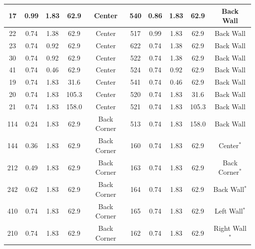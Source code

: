 \begin{table}
\begin{center}
\begin{tabular}{|c|c|c|c|c||c|c|c|c|c|}
17      & 0.99      & 1.83          &  62.9      & Center       & 540   & 0.86      & 1.83        &  62.9         & Back Wall           \\ \hline
22      & 0.74      & 1.38          &  62.9      & Center       & 517   & 0.99      & 1.83        &  62.9         & Back Wall           \\ \hline
23      & 0.74      & 0.92          &  62.9      & Center       & 622   & 0.74      & 1.38        &  62.9         & Back Wall           \\ \hline
30      & 0.74      & 0.92          &  62.9      & Center       & 522   & 0.74      & 1.38        &  62.9         & Back Wall           \\ \hline
41      & 0.74      & 0.46          &  62.9      & Center       & 524   & 0.74      & 0.92        &  62.9         & Back Wall           \\ \hline
19      & 0.74      & 1.83          &  31.6      & Center       & 541   & 0.74      & 0.46        &  62.9         & Back Wall           \\ \hline
20      & 0.74      & 1.83          &  105.3     & Center       & 520   & 0.74      & 1.83        &  31.6         & Back Wall           \\ \hline
21      & 0.74      & 1.83          &  158.0     & Center       & 521   & 0.74      & 1.83        &  105.3        & Back Wall           \\ \hline
114     & 0.24      & 1.83          &  62.9      & Back Corner  & 513   & 0.74      & 1.83        &  158.0        & Back Wall           \\ \hline
144     & 0.36      & 1.83          &  62.9      & Back Corner  & 160   & 0.74      & 1.83        &  62.9         & Center$^*$          \\ \hline
212     & 0.49      & 1.83          &  62.9      & Back Corner  & 163   & 0.74      & 1.83        &  62.9         & Back Corner$^*$     \\ \hline
242     & 0.62      & 1.83          &  62.9      & Back Corner  & 164   & 0.74      & 1.83        &  62.9         & Back Wall$^*$       \\ \hline
410     & 0.74      & 1.83          &  62.9      & Back Corner  & 165   & 0.74      & 1.83        &  62.9         & Left Wall$^*$       \\ \hline
210     & 0.74      & 1.83          &  62.9      & Back Corner  & 162   & 0.74      & 1.83        &  62.9         & Right Wall$^*$      \\ \hline

\end{tabular}
\end{center}
\end{table}
